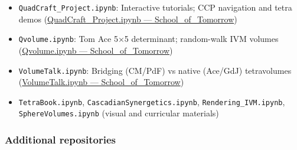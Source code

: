 \documentclass[
  10pt,
]{article}
\providecommand{\tightlist}{%
  \setlength{\itemsep}{0pt}\setlength{\parskip}{0pt}}
\begin{document}
\begin{itemize}
  \begin{itemize}
  \tightlist
  \item
    \texttt{QuadCraft\_Project.ipynb}: Interactive tutorials; CCP
    navigation and tetra demos
    (\href{https://github.com/4dsolutions/School_of_Tomorrow/blob/master/QuadCraft_Project.ipynb}{QuadCraft\_Project.ipynb
    --- School\_of\_Tomorrow})
  \item
    \texttt{Qvolume.ipynb}: Tom Ace 5×5 determinant; random-walk IVM
    volumes
    (\href{https://github.com/4dsolutions/School_of_Tomorrow/blob/master/Qvolume.ipynb}{Qvolume.ipynb
    --- School\_of\_Tomorrow})
  \item
    \texttt{VolumeTalk.ipynb}: Bridging (CM/PdF) vs native (Ace/GdJ)
    tetravolumes
    (\href{https://github.com/4dsolutions/School_of_Tomorrow/blob/master/VolumeTalk.ipynb}{VolumeTalk.ipynb
    --- School\_of\_Tomorrow})
  \item
    \texttt{TetraBook.ipynb}, \texttt{CascadianSynergetics.ipynb},
    \texttt{Rendering\_IVM.ipynb}, \texttt{SphereVolumes.ipynb} (visual
    and curricular materials)
  \end{itemize}
\end{itemize}

\hypertarget{additional-repositories}{%
\subsubsection{Additional repositories}\label{additional-repositories}}
\end{document}
